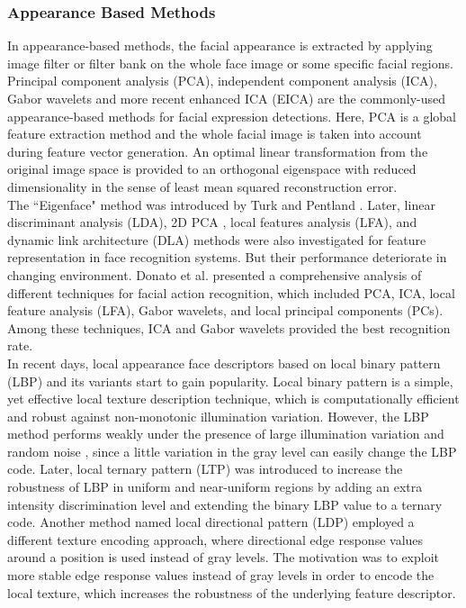 \documentclass[12pt]{article}
\begin{document}
\subsubsection{Appearance Based Methods}
\noindent In appearance-based methods, the facial appearance is extracted by applying image filter or filter bank on the whole face image or some specific facial regions. Principal component analysis (PCA)\cite{cPadgetts}, independent component analysis (ICA)\cite{msBarlett,ccFA}, Gabor wavelets\cite{Yingli,mjLyons} and more recent
enhanced ICA (EICA)\cite{expFromVideo} are the commonly-used appearance-based methods for facial expression detections. Here, PCA is a global feature extraction method and  the
whole facial image is taken into account during feature vector generation. An optimal linear transformation from the original image space is provided
to an orthogonal eigenspace with reduced dimensionality in the sense of least mean
squared reconstruction error\cite{fcLBP}.\\
\noindent
\noindent The ``Eigenface" method was introduced by Turk and Pentland \cite{maTurk1991}. Later, linear discriminant analysis (LDA)\cite{discriminantAnalysis}, 2D PCA \cite{2DPCA}, local features analysis (LFA)\cite{LFA}, and dynamic link
architecture (DLA) \cite{DLA} methods were also investigated for feature representation
in face recognition systems. But their performance deteriorate in changing environment\cite{sobelLBP}. Donato et al.\cite{classifyFA} presented a comprehensive
analysis of different techniques for facial action recognition, which included PCA,
ICA, local feature analysis (LFA), Gabor wavelets, and local principal components (PCs). Among these techniques, ICA and Gabor wavelets provided the
best recognition rate. \\
\linebreak
\noindent In recent days, local appearance face descriptors based on local binary pattern
(LBP) \cite{fdLBP,fiaLBP} and its variants\cite{boosterFER} start to gain popularity. Local binary pattern is a
simple, yet effective local texture description technique, which is computationally efficient and robust against non-monotonic illumination variation. However, the LBP method performs weakly under the presence of large illumination
variation and random noise \cite{enhancedLTP1}, since a little variation in the gray level can easily
change the LBP code. Later, local ternary pattern (LTP) \cite{enhancedLTP1} was introduced to
increase the robustness of LBP in uniform and near-uniform regions by adding an extra intensity discrimination level and extending the binary LBP value to
a ternary code. Another method
named local directional pattern (LDP) \cite{robustFace} employed a different texture encoding
approach, where directional edge response values around a position is used instead
of gray levels. The motivation was to exploit more stable edge response values
instead of gray levels in order to encode the local texture, which increases the
robustness of the underlying feature descriptor.\\
\end{document}
